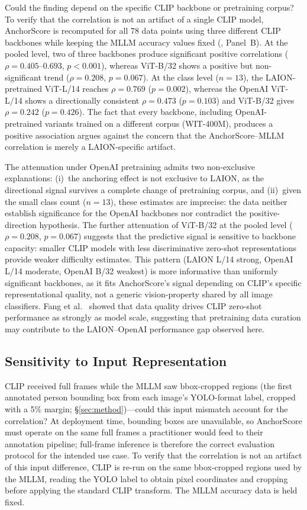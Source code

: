 \documentclass[11pt,a4paper]{article}
\begin{document}
Could the finding depend on the specific CLIP backbone or pretraining corpus? To verify that the correlation is not an artifact of a single CLIP model, AnchorScore is recomputed for all 78 data points using three different CLIP backbones while keeping the MLLM accuracy values fixed (, Panel~B). At the pooled level, two of three backbones produce significant positive correlations ($\rho=0.405$--$0.693$, $p<0.001$), whereas ViT-B/32 shows a positive but non-significant trend ($\rho=0.208$, $p=0.067$). At the class level ($n=13$), the LAION-pretrained ViT-L/14 reaches $\rho=0.769$ ($p=0.002$), whereas the OpenAI ViT-L/14 shows a directionally consistent $\rho=0.473$ ($p=0.103$) and ViT-B/32 gives $\rho=0.242$ ($p=0.426$). The fact that every backbone, including OpenAI-pretrained variants trained on a different corpus (WIT-400M), produces a positive association argues against the concern that the AnchorScore--MLLM correlation is merely a LAION-specific artifact.

The attenuation under OpenAI pretraining admits two non-exclusive explanations: (i)~the anchoring effect is not exclusive to LAION, as the directional signal survives a complete change of pretraining corpus, and (ii)~given the small class count ($n=13$), these estimates are imprecise: the data neither establish significance for the OpenAI backbones nor contradict the positive-direction hypothesis. The further attenuation of ViT-B/32 at the pooled level ($\rho=0.208$, $p=0.067$) suggests that the predictive signal is sensitive to backbone capacity: smaller CLIP models with less discriminative zero-shot representations provide weaker difficulty estimates. This pattern (LAION L/14 strong, OpenAI L/14 moderate, OpenAI B/32 weakest) is more informative than uniformly significant backbones, as it fits AnchorScore's signal depending on CLIP's specific representational quality, not a generic vision-property shared by all image classifiers. Fang et al.~\cite{fang2024data} showed that data quality drives CLIP zero-shot performance as strongly as model scale, suggesting that pretraining data curation may contribute to the LAION--OpenAI performance gap observed here.



\subsection{Sensitivity to Input Representation}
\label{sec:input_repr}

CLIP received full frames while the MLLM saw bbox-cropped regions (the first annotated person bounding box from each image's YOLO-format label, cropped with a 5\% margin; \S\ref{sec:method})---could this input mismatch account for the correlation? At deployment time, bounding boxes are unavailable, so AnchorScore must operate on the same full frames a practitioner would feed to their annotation pipeline; full-frame inference is therefore the correct evaluation protocol for the intended use case. To verify that the correlation is not an artifact of this input difference, CLIP is re-run on the same bbox-cropped regions used by the MLLM, reading the YOLO label to obtain pixel coordinates and cropping before applying the standard CLIP transform. The MLLM accuracy data is held fixed.
\end{document}

